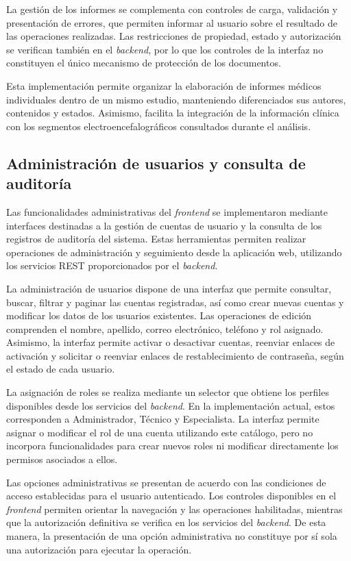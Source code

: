 La gestión de los informes se complementa
con controles de carga, validación y
presentación de errores, que permiten
informar al usuario sobre el resultado
de las operaciones realizadas.
Las restricciones de propiedad,
estado y autorización se verifican
también en el \textit{backend}, por lo que
los controles de la interfaz no
constituyen el único mecanismo
de protección de los documentos.

Esta implementación permite organizar
la elaboración de informes médicos
individuales dentro de un mismo estudio,
manteniendo diferenciados sus autores,
contenidos y estados. Asimismo, facilita
la integración de la información clínica
con los segmentos electroencefalográficos
consultados durante el análisis.


\subsection{Administración de usuarios y consulta de auditoría}

Las funcionalidades administrativas del \textit{frontend}
se implementaron mediante interfaces destinadas
a la gestión de cuentas de usuario y la consulta
de los registros de auditoría del sistema.
Estas herramientas permiten realizar operaciones
de administración y seguimiento desde la
aplicación web, utilizando los servicios REST
proporcionados por el \textit{backend}.


La administración de usuarios dispone de una
interfaz que permite consultar, buscar, filtrar
y paginar las cuentas registradas, así como
crear nuevas cuentas y modificar los datos
de los usuarios existentes. Las operaciones
de edición comprenden el nombre, apellido,
correo electrónico, teléfono y rol asignado.
Asimismo, la interfaz permite activar o
desactivar cuentas, reenviar enlaces de
activación y solicitar o reenviar enlaces
de restablecimiento de contraseña, según
el estado de cada usuario.

La asignación de roles se realiza mediante
un selector que obtiene los perfiles
disponibles desde los servicios del \textit{backend}.
En la implementación actual, estos
corresponden a Administrador, Técnico y
Especialista. La interfaz permite asignar
o modificar el rol de una cuenta utilizando
este catálogo, pero no incorpora
funcionalidades para crear nuevos roles
ni modificar directamente los permisos
asociados a ellos.

Las opciones administrativas se presentan
de acuerdo con las condiciones de acceso
establecidas para el usuario autenticado.
Los controles disponibles en el \textit{frontend}
permiten orientar la navegación y las
operaciones habilitadas, mientras que
la autorización definitiva se verifica
en los servicios del \textit{backend}. De esta
manera, la presentación de una opción
administrativa no constituye por sí sola
una autorización para ejecutar la operación.

